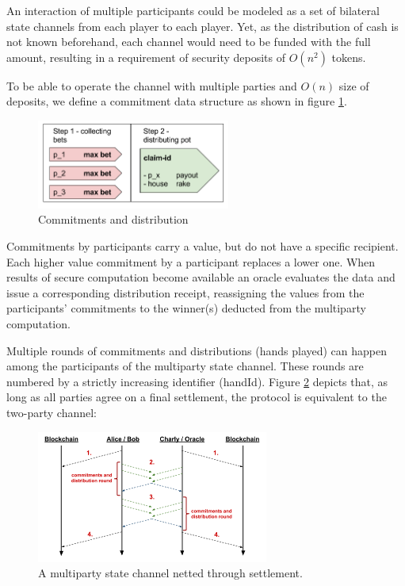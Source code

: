 An interaction of multiple participants could be modeled as a set of bilateral state channels from each player to each player. Yet, as the distribution of cash is not known beforehand, each channel would need to be funded with the full amount, resulting in a requirement of security deposits of \(O(n^2)\) tokens.

To be able to operate the channel with multiple parties and \(O(n)\) size of deposits, we define a commitment data structure as shown in figure \ref{mpc_round}. 

\begin{figure}[!ht]
\centering
\includegraphics[width=2.5in]{images/bet.png}
\caption{Commitments and distribution}
\label{mpc_round}
\end{figure}

Commitments by participants carry a value, but do not have a specific recipient. Each higher value commitment by a participant replaces a lower one. When results of secure computation become available an oracle evaluates the data and issue a corresponding distribution receipt, reassigning the values from the participants' commitments to the winner(s) deducted from the multiparty computation.

Multiple rounds of commitments and distributions (hands played) can happen among the participants of the multiparty state channel. These rounds are numbered by a strictly increasing identifier (handId). Figure \ref{mpc_settle} depicts that, as long as all parties agree on a final settlement, the protocol is equivalent to the two-party channel:

\begin{figure}[!ht]
\centering
\includegraphics[width=3.0in]{images/multiSettle.png}
\caption{A multiparty state channel netted through settlement.}
\label{mpc_settle}
\end{figure}

